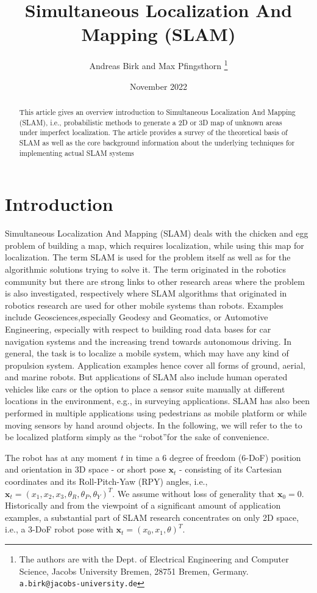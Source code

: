 \documentclass{article}
\title{Simultaneous Localization And Mapping (SLAM)}
\author{Andreas Birk and Max Pfingsthorn
\thanks{The authors are with the Dept. of Electrical Engineering and Computer Science, Jacobs University Bremen, 28751
Bremen, Germany. {\tt\small
a.birk@jacobs-university.de}}}
\date{November 2022}
\begin{document}
\maketitle
\begin{abstract}
This article gives an overview introduction to Simultaneous Localization And Mapping (SLAM), i.e., probabilistic methods to generate a 2D or 3D map of unknown areas under imperfect localization. The article provides a survey of the theoretical basis of SLAM as well as the core background information about the underlying techniques for implementing actual SLAM systems
\end{abstract}


\section{\label{sec:intro}Introduction}
Simultaneous Localization And Mapping (SLAM) deals with the chicken and egg problem of building a map, which requires localization, while using this map for localization.  
The term SLAM is used for the problem itself as well as for the algorithmic solutions trying to solve it.  
The term originated in the robotics community but there are strong links to other research areas where the problem is also investigated, respectively where SLAM algorithms that originated in robotics research are used for other mobile systems than robots.  
Examples include Geosciences,especially Geodesy and Geomatics, or Automotive Engineering, especially with respect to building road data bases for car navigation systems and the increasing trend towards autonomous driving.  
In general, the task is to localize a mobile system, which may have any kind of propulsion system.  
Application examples hence cover all forms of ground, aerial, and marine robots.  
But applications of SLAM also include human operated vehicles like cars or the option to place a sensor suite manually at different locations in the environment, e.g., in surveying applications.
SLAM  has  also  been  performed  in  multiple  applications  using  pedestrians  as  mobile  platform  or  while  moving sensors by hand around objects.  In the following, we will refer to the to be localized platform simply as the “robot”for the sake of convenience.

The  robot  has  at  any  moment \textit{t} in time  a  6  degree  of  freedom  (6-DoF)  position  and  orientation  in  3D space  -  or  short  pose $\mathbf{x}_{t}$ -  consisting  of  its  Cartesian  coordinates  and  its  Roll-Pitch-Yaw  (RPY)  angles,  i.e., $\mathbf{x}_{t}=(x_{1},x_{2},x_{3},\theta_{R},\theta_{P},\theta_{Y})^{T}$.   
We  assume  without  loss  of  generality  that $\mathbf{x}_{0}=0$.   
Historically  and  from  the viewpoint of a significant amount of application examples,  a substantial part of SLAM research concentrates on only 2D space, i.e., a 3-DoF robot pose with $\mathbf{x}_{t}=(x_{0},x_{1},\theta)^{T}$.
\end{document}
